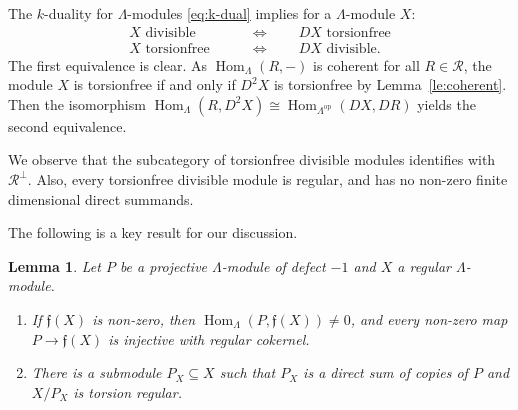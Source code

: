 \documentclass[a4paper]{amsart}
\theoremstyle{plain}
\newtheorem{lem}[thm]{Lemma}
\theoremstyle{definition}
\theoremstyle{remark}
\numberwithin{equation}{section}
\newcommand{\Hom}{\operatorname{Hom}}
\newcommand{\op}{\mathrm{op}}
\def\R{\mathcal R}
\newcommand{\frf}{\mathfrak f}
\def\La{\Lambda}
\begin{document}
The $k$-duality for $\Lambda$-modules \eqref{eq:k-dual} implies for a $\Lambda$-module $X$:
\begin{align*}
X \text{ divisible} \qquad &\iff \qquad DX \text{ torsionfree}\\
X \text{ torsionfree} \qquad &\iff \qquad DX\text{ divisible}.
\end{align*}
The first equivalence is clear. As $\Hom_\Lambda(R,-)$ is coherent for
all $R\in\R$, the module $X$ is torsionfree if and only if $D^2X$ is
torsionfree by Lemma~\ref{le:coherent}. Then the isomorphism
$\Hom_\Lambda(R,D^2X)\cong \Hom_{\Lambda^\op}(DX,DR)$ yields the
second equivalence.

We observe that the subcategory of torsionfree divisible modules
identifies with $\R^\perp$. Also, every torsionfree divisible module is
regular, and has no non-zero finite dimensional direct summands.

The following is a  key result for our discussion.
\begin{lem}\label{le:sub-P}
Let $P$ be a projective $\Lambda$-module of defect $-1$ and $X$ a regular $\Lambda$-module.
\begin{enumerate}
\item If $\frf(X)$ is non-zero, then $\Hom_\La(P,\frf(X))\neq 0$, and
  every non-zero map $P\to\frf(X)$ is injective with regular cokernel.
\item There is a submodule $P_X\subseteq X$ such that $P_X$ is a direct sum of copies of $P$ and $X/P_X$ is torsion regular.
\end{enumerate}
\end{lem}
\end{document}
